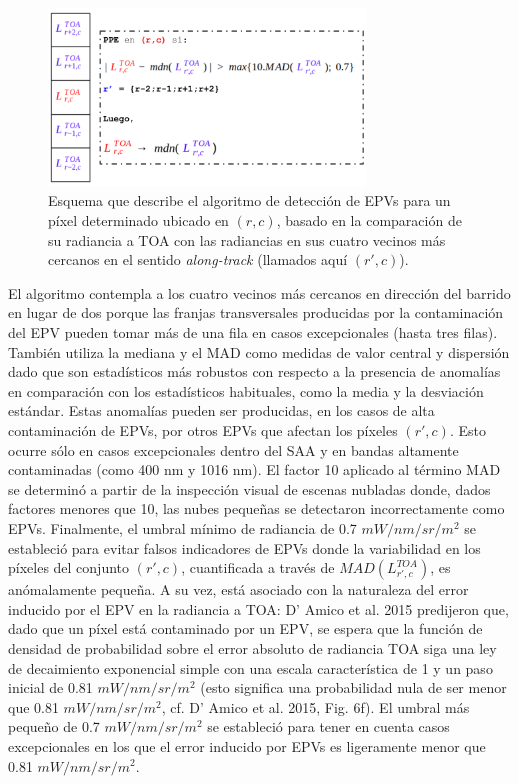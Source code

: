     \begin{figure}
    \centering
    \includegraphics[width=0.75\textwidth]{ppe/figures/ppeAlgo}
    \caption[Esquema que describe el algoritmo de detección de EPVs para un píxel determinado.]{Esquema que describe el algoritmo de detección de EPVs para un píxel determinado ubicado en $(r,c)$, basado en la comparación de su radiancia a TOA con las radiancias en sus cuatro vecinos más cercanos en el sentido \textit{along-track} (llamados aquí $(r', c)$).}
    \label{ppe:ppeAlgo}
    \end{figure}

    El algoritmo contempla a los cuatro vecinos más cercanos en dirección del barrido en lugar de dos porque las franjas transversales producidas por la contaminación del EPV pueden tomar más de una fila en casos excepcionales (hasta tres filas). También utiliza la mediana y el MAD como medidas de valor central y dispersión dado que son estadísticos más robustos con respecto a la presencia de anomalías en comparación con los estadísticos habituales, como la media y la desviación estándar. Estas anomalías pueden ser producidas, en los casos de alta contaminación de EPVs, por otros EPVs que afectan los píxeles $(r',c)$. Esto ocurre sólo en casos excepcionales dentro del SAA y en bandas altamente contaminadas (como 400 nm y 1016 nm).
    El factor 10 aplicado al término MAD se determinó a partir de la inspección visual de escenas nubladas donde, dados factores menores que 10, las nubes pequeñas se detectaron incorrectamente como EPVs.
    Finalmente, el umbral mínimo de radiancia de 0.7 $mW/nm/sr/m^{2}$ se estableció para evitar falsos indicadores de EPVs donde la variabilidad en los píxeles del conjunto $(r',c)$, cuantificada a través de $MAD(L^{TOA}_{r',c})$, es anómalamente pequeña. A su vez, está asociado con la naturaleza del error inducido por el EPV en la radiancia a TOA: D' Amico et al. 2015 \cite{damico2015} predijeron que, dado que un píxel está contaminado por un EPV, se espera que la función de densidad de probabilidad sobre el error absoluto de radiancia TOA siga una ley de decaimiento exponencial simple con una escala característica de 1 y un paso inicial de 0.81 $mW/nm/sr/m^{2}$ (esto significa una probabilidad nula de ser menor que 0.81 $mW/nm/sr/m^{2}$, cf. D' Amico et al. 2015, Fig. 6f). El umbral más pequeño de 0.7 $mW/nm/sr/m^{2}$ se estableció para tener en cuenta casos excepcionales en los que el error inducido por EPVs es ligeramente menor que 0.81 $mW/nm/sr/m^{2}$.
    
